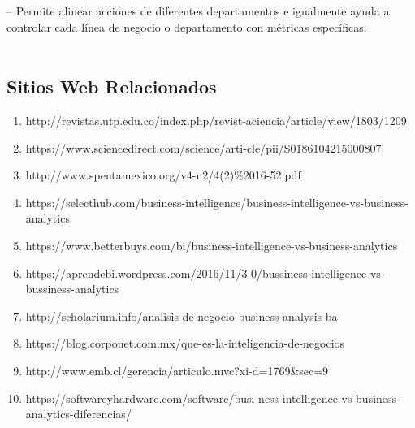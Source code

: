 \documentclass[a4paper,12pt,twocolumn]{article}
\begin{document}
– Permite alinear acciones de diferentes departamentos e igualmente ayuda a controlar cada línea de negocio o departamento con métricas específicas.\textbf{}\\
\textbf{}\\

\newpage\subsection*{Sitios Web Relacionados}
\begin{enumerate}
\item http://revistas.utp.edu.co/index.php/revist-aciencia/article/view/1803/1209
\item https://www.sciencedirect.com/science/arti-cle/pii/S0186104215000807
\item http://www.spentamexico.org/v4-n2/4(2)\%2016-52.pdf
\item https://selecthub.com/business-intelligence/business-intelligence-vs-business-analytics
\item https://www.betterbuys.com/bi/business-intelligence-vs-business-analytics
\item https://aprendebi.wordpress.com/2016/11/3-0/bussiness-intelligence-vs-bussiness-analytics
\item http://scholarium.info/analisis-de-negocio-business-analysis-ba
\item https://blog.corponet.com.mx/que-es-la-inteligencia-de-negocios
\item http://www.emb.cl/gerencia/articulo.mvc?xi-d=1769&sec=9
\item https://softwareyhardware.com/software/busi-ness-intelligence-vs-business-analytics-diferencias/
\end{enumerate}
\end{document}
